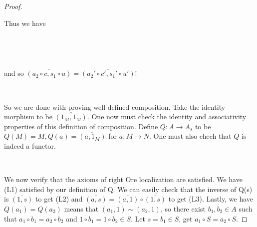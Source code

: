 \documentclass[12pt]{amsart}    %
\theoremstyle{definition}
\begin{document}
\begin{proof}
\

Thus we have

\
\begin{center}
\end{center}

\

 and so $\overline{(a_2 \circ c, s_1 \circ u)} = \overline{(a_2'\circ c', s_1' \circ u')}$! 


\

So we are done with proving well-defined composition.  Take the identity morphism to be $\overline{(1_M,1_M)}$. One now must check the identity and associativity properties of this definition of composition.  Define $Q: A \rightarrow A_s$ to be $Q(M) = M, Q(a) = \overline{(a,1_M)}$ for $a: M \rightarrow N$.  One must also chech that $Q$ is indeed a functor.

\

We now verify that the axioms of right Ore localization are satisfied.  We have (L1) satisfied by our definition of Q.  We can easily check that the inverse of Q(s) is $\overline{(1,s)}$ to get (L2) and $\overline{(a,s)} = \overline{(a,1)}\circ \overline{(1,s)}$ to get (L3).  Lastly, we have $Q(a_1)  = Q(a_2)$ means that $(a_1, 1) \sim (a_2, 1)$, so there exist $b_1, b_2 \in A$ such that $a_1 \circ b_1 = a_2 \circ b_2$ and $1 \circ b_1 = 1 \circ b_2 \in S$.  Let $s = b_1 \in S$, get $a_1 \circ S = a_2 \circ S$.


\end{proof}
\end{document}
